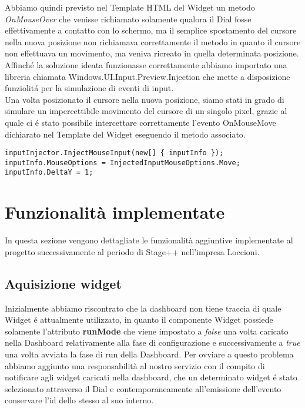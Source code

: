 Abbiamo quindi previsto nel Template HTML del Widget un metodo \emph{OnMouseOver} che venisse richiamato solamente qualora il Dial fosse effettivamente a contatto con lo schermo, ma il semplice spostamento del cursore nella nuova posizione non richiamava correttamente il metodo in quanto il cursore non effettuava un movimento, ma veniva ricreato in quella determinata posizione.
Affinché la soluzione ideata funzionasse correttamente abbiamo importato una libreria chiamata Windows.UI.Input.Preview.Injection\cite{ipi} che mette a disposizione funziolitá per la simulazione di eventi di input.\\

Una volta posizionato il cursore nella nuova posizione, siamo stati in grado di simulare un impercettibile movimento del cursore di un singolo pixel, grazie al quale ci é stato possibile intercettare correttamente l’evento OnMouseMove dichiarato nel Template del Widget eseguendo il metodo associato.

\vspace{1.0cm}
\begin{lstlisting}[caption={Spostamento cursore},style=javaScriptCode]
inputInjector.InjectMouseInput(new[] { inputInfo });
inputInfo.MouseOptions = InjectedInputMouseOptions.Move;
inputInfo.DeltaY = 1;
\end{lstlisting} 
\vspace{1.0cm} 

\section{Funzionalità implementate}

In questa sezione vengono dettagliate le funzionalità aggiuntive implementate al progetto successivamente al periodo di Stage++ nell'impresa Loccioni.

\subsection{Aquisizione widget}

Inizialmente abbiamo riscontrato che la dashboard non tiene traccia di quale Widget é attualmente utilizzato, in quanto il componente Widget possiede solamente l'attributo \textbf{runMode} che viene impostato a \emph{false} una volta caricato nella Dashboard relativamente alla fase di configurazione e successivamente a \emph{true} una volta avviata la fase di run della Dashboard. Per ovviare a questo problema abbiamo aggiunto una responsabilità al nostro servizio con il compito di notificare agli widget caricati nella dashboard, che un determinato widget é stato selezionato attraverso il Dial e contemporaneamente all'emissione dell'evento conservare l'id dello stesso al suo interno.


